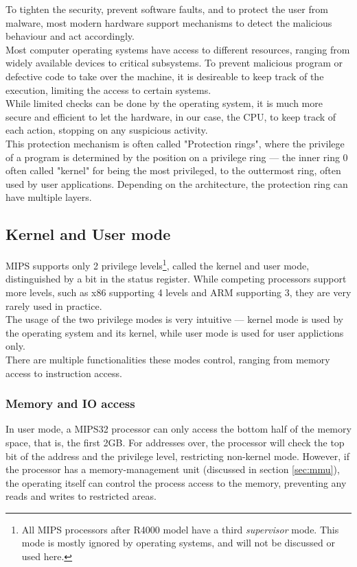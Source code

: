 \label{sec:privileges}
To tighten the security, prevent software faults, and to protect the user from
malware, most modern hardware support mechanisms to detect the malicious behaviour
and act accordingly.\\
Most computer operating systems have access to different resources, ranging from
widely available devices to critical subsystems. To prevent malicious
program or defective code to take over the machine, it is desireable to keep
track of the execution, limiting the access to certain systems.\\
While limited checks can be done by the operating system, it is much more
secure and efficient to let the hardware, in our case, the CPU, to keep track
of each action, stopping on any suspicious activity.\\
This protection mechanism is often called "Protection rings", where the privilege
of a program is determined by the position on a privilege ring --- the inner ring 0
often called "kernel" for being the most privileged, to the outtermost ring,
often used by user applications. Depending on the architecture, the protection
ring can have multiple layers.

\subsection{Kernel and User mode}
MIPS supports only 2 privilege levels\footnote{All MIPS processors after R4000 model have a
third \textit{supervisor} mode. This mode is mostly ignored by operating systems,
and will not be discussed or used here.\cite{see_mips_run}}, called the kernel and user mode,
distinguished by a bit in the status register. While competing processors support
more levels, such as x86 supporting 4\cite{intelmanual} levels and ARM supporting 3\cite{arm:migrating_5_7},
they are very rarely used in practice.\\
The usage of the two privilege modes is very intuitive --- kernel mode is used
by the operating system and its kernel, while user mode is used for user applictions
only.\\
There are multiple functionalities these modes control, ranging from memory access
to instruction access.

\subsubsection{Memory and IO access}
In user mode, a MIPS32 processor can only access the bottom half of the memory
space, that is, the first 2GB. For addresses over, the processor will check
the top bit of the address and the privilege level, restricting non-kernel mode.
However, if the processor has a memory-management unit (discussed in section \ref{sec:mmu}),
the operating itself can control the process access to the memory, preventing
any reads and writes to restricted areas.

